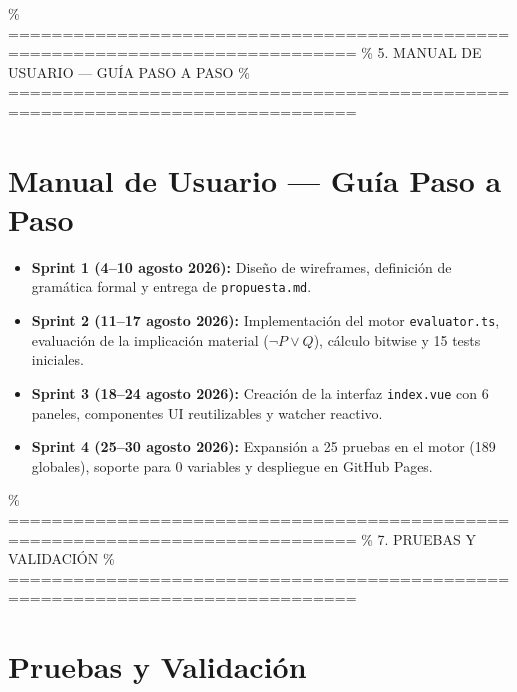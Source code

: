 \documentclass[11pt,a4paper]{article}
\begin{document}
\% ==============================================================================
\% 5. MANUAL DE USUARIO --- GUÍA PASO A PASO
\% ==============================================================================
\section{Manual de Usuario --- Guía Paso a Paso}

\begin{itemize}[leftmargin=*]
  \item \textbf{Sprint 1 (4--10 agosto 2026):} Diseño de wireframes, definición de gramática formal y entrega de \texttt{propuesta.md}.
  \item \textbf{Sprint 2 (11--17 agosto 2026):} Implementación del motor \texttt{evaluator.ts}, evaluación de la implicación material ($\neg P \lor Q$), cálculo bitwise y 15 tests iniciales.
  \item \textbf{Sprint 3 (18--24 agosto 2026):} Creación de la interfaz \texttt{index.vue} con 6 paneles, componentes UI reutilizables y watcher reactivo.
  \item \textbf{Sprint 4 (25--30 agosto 2026):} Expansión a 25 pruebas en el motor (189 globales), soporte para 0 variables y despliegue en GitHub Pages.
\end{itemize}

\% ==============================================================================
\% 7. PRUEBAS Y VALIDACIÓN
\% ==============================================================================
\section{Pruebas y Validación}
\end{document}
